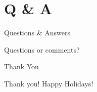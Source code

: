 \documentclass{beamer}
\begin{document}
\section{Q \& A}

\begin{frame}{Questions \& Answers}
\begin{center}
\Huge Questions or comments?
\end{center}
\end{frame}

\begin{frame}{Thank You}
\begin{center}
\Huge Thank you! Happy Holidays!
\end{center}
\end{frame}
\end{document}
